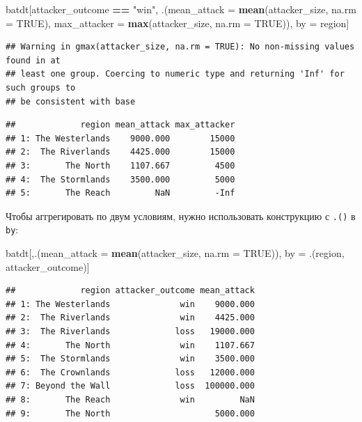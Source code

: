 \documentclass[]{book}
\newenvironment{Shaded}{\begin{snugshade}}{\end{snugshade}}
\newcommand{\KeywordTok}[1]{\textcolor[rgb]{0.13,0.29,0.53}{\textbf{#1}}}
\newcommand{\DataTypeTok}[1]{\textcolor[rgb]{0.13,0.29,0.53}{#1}}
\newcommand{\StringTok}[1]{\textcolor[rgb]{0.31,0.60,0.02}{#1}}
\newcommand{\OtherTok}[1]{\textcolor[rgb]{0.56,0.35,0.01}{#1}}
\newcommand{\OperatorTok}[1]{\textcolor[rgb]{0.81,0.36,0.00}{\textbf{#1}}}
\newcommand{\NormalTok}[1]{#1}
\begin{document}
\begin{Shaded}
\begin{Highlighting}[]
\NormalTok{batdt[attacker_outcome }\OperatorTok{==}\StringTok{ "win"}\NormalTok{, }
\NormalTok{      .(}\DataTypeTok{mean_attack =} \KeywordTok{mean}\NormalTok{(attacker_size, }\DataTypeTok{na.rm =} \OtherTok{TRUE}\NormalTok{), }
        \DataTypeTok{max_attacker =} \KeywordTok{max}\NormalTok{(attacker_size, }\DataTypeTok{na.rm =} \OtherTok{TRUE}\NormalTok{)), }
\NormalTok{      by =}\StringTok{ }\NormalTok{region]}
\end{Highlighting}
\end{Shaded}

\begin{verbatim}
## Warning in gmax(attacker_size, na.rm = TRUE): No non-missing values found in at
## least one group. Coercing to numeric type and returning 'Inf' for such groups to
## be consistent with base
\end{verbatim}

\begin{verbatim}
##             region mean_attack max_attacker
## 1: The Westerlands    9000.000        15000
## 2:  The Riverlands    4425.000        15000
## 3:       The North    1107.667         4500
## 4:  The Stormlands    3500.000         5000
## 5:       The Reach         NaN         -Inf
\end{verbatim}

Чтобы аггрегировать по двум условиям, нужно использовать конструкцию с
\texttt{.()} в \texttt{by}:

\begin{Shaded}
\begin{Highlighting}[]
\NormalTok{batdt[,.(}\DataTypeTok{mean_attack =} \KeywordTok{mean}\NormalTok{(attacker_size, }\DataTypeTok{na.rm =} \OtherTok{TRUE}\NormalTok{)), by =}\StringTok{ }\NormalTok{.(region, attacker_outcome)]}
\end{Highlighting}
\end{Shaded}

\begin{verbatim}
##             region attacker_outcome mean_attack
## 1: The Westerlands              win    9000.000
## 2:  The Riverlands              win    4425.000
## 3:  The Riverlands             loss   19000.000
## 4:       The North              win    1107.667
## 5:  The Stormlands              win    3500.000
## 6:  The Crownlands             loss   12000.000
## 7: Beyond the Wall             loss  100000.000
## 8:       The Reach              win         NaN
## 9:       The North                     5000.000
\end{verbatim}
\end{document}
